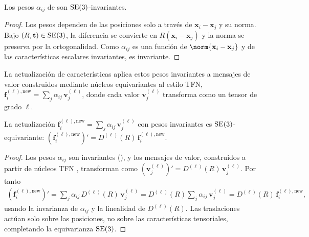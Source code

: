 \begin{proposition}
\label{prop:groups:se3-attention-invariance}
Los pesos $\alpha_{ij}$ de  son
$\operatorname{SE}(3)$-invariantes.
\end{proposition}

\begin{proof}
Los pesos dependen de las posiciones solo a trav\'es de $\mathbf{x}_i -
\mathbf{x}_j$ y su norma. Bajo $(R, \mathbf{t}) \in \operatorname{SE}(3)$, la diferencia se
convierte en $R(\mathbf{x}_i - \mathbf{x}_j)$ y la norma se preserva por la
ortogonalidad. Como $\alpha_{ij}$ es una funci\'on de $\norm{\mathbf{x}_i -
\mathbf{x}_j}$ y de las caracter\'isticas escalares invariantes, es invariante.
\end{proof}

La actualizaci\'on de caracter\'isticas aplica estos pesos invariantes a mensajes
de valor construidos mediante n\'ucleos equivariantes al estilo TFN,
$\mathbf{f}_i^{(\ell),\text{new}} = \sum_{j} \alpha_{ij}\,
\mathbf{v}_j^{(\ell)}$, donde cada valor $\mathbf{v}_j^{(\ell)}$ transforma como
un tensor de grado $\ell$.

\begin{theorem}
\label{thm:groups:se3-transformer-equivariance}
La actualizaci\'on $\mathbf{f}_i^{(\ell),\text{new}} = \sum_{j} \alpha_{ij}\,
\mathbf{v}_j^{(\ell)}$ con pesos invariantes  es
$\operatorname{SE}(3)$-equivariante: $(\mathbf{f}_i^{(\ell),\text{new}})' = D^{(\ell)}(R)\,
\mathbf{f}_i^{(\ell),\text{new}}$.
\end{theorem}

\begin{proof}
Los pesos $\alpha_{ij}$ son invariantes
(), y los mensajes de valor,
construidos a partir de n\'ucleos TFN
\citep{thomas2018tensorfieldnetworks}, transforman como
$(\mathbf{v}_j^{(\ell)})' = D^{(\ell)}(R)\, \mathbf{v}_j^{(\ell)}$. Por tanto
\begin{align}
  (\mathbf{f}_i^{(\ell),\text{new}})'
  = \sum_{j} \alpha_{ij}\, D^{(\ell)}(R)\, \mathbf{v}_j^{(\ell)}
  = D^{(\ell)}(R) \sum_{j} \alpha_{ij}\, \mathbf{v}_j^{(\ell)}
  = D^{(\ell)}(R)\, \mathbf{f}_i^{(\ell),\text{new}},
\end{align}
usando la invarianza de $\alpha_{ij}$ y la linealidad de $D^{(\ell)}(R)$. Las
traslaciones act\'uan solo sobre las posiciones, no sobre las caracter\'isticas
tensoriales, completando la equivarianza $\operatorname{SE}(3)$.
\end{proof}

